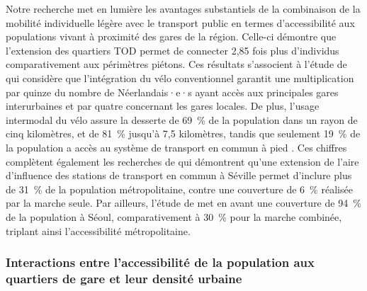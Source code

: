 \begin{refsegment}
Notre recherche met en lumière les avantages substantiels de la combinaison de la mobilité individuelle légère avec le transport public en termes d'accessibilité aux populations vivant à proximité des gares de la région. Celle-ci démontre que l'extension des quartiers \acrshort{TOD} permet de connecter 2,85 fois plus d'individus comparativement aux périmètres piétons. Ces résultats s'associent à l'étude de \textcolor{blue}{\textcite[213]{kager_characterisation_2016}} qui considère que l'intégration du vélo conventionnel garantit une multiplication par quinze du nombre de Néerlandais·e·s ayant accès aux principales gares interurbaines et par quatre concernant les gares locales. De plus, l'usage intermodal du vélo assure la desserte de 69~\% de la population dans un rayon de cinq kilomètres, et de 81~\% jusqu'à 7,5 kilomètres, tandis que seulement 19~\% de la population a accès au système de transport en commun à pied  \textcolor{blue}{\autocite[213]{kager_characterisation_2016}}. Ces chiffres complètent également les recherches de \textcolor{blue}{\textcite[22]{marques_potential_2017}} qui démontrent qu'une extension de l'aire d'influence des stations de transport en commun à Séville permet d'inclure plus de 31~\% de la population métropolitaine, contre une couverture de 6~\% réalisée par la marche seule. Par ailleurs, l'étude de \textcolor{blue}{\textcite[982]{lee_bicycle-based_2016}} met en avant une couverture de 94~\% de la population à Séoul, comparativement à 30~\% pour la marche combinée, triplant ainsi l'accessibilité métropolitaine.%

\subsubsection*{Interactions entre l'accessibilité de la population aux quartiers de gare et leur densité urbaine
    \label{chap5:analyse-bivariee-densite-accessibilite}
    }


\end{refsegment}
